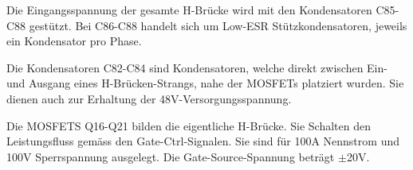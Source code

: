 Die Eingangsspannung der gesamte H-Brücke wird mit den Kondensatoren C85-C88 gestützt.
Bei C86-C88 handelt sich um Low-ESR Stützkondensatoren, jeweils ein Kondensator pro Phase.

Die Kondensatoren C82-C84 sind Kondensatoren, welche direkt zwischen Ein- und Ausgang eines H-Brücken-Strangs, nahe der MOSFETs platziert wurden.
Sie dienen auch zur Erhaltung der 48V-Versorgungsspannung.

Die MOSFETS Q16-Q21 bilden die eigentliche H-Brücke. Sie Schalten den Leistungsfluss gemäss den Gate-Ctrl-Signalen. Sie sind für 100A Nennstrom und 100V Sperrspannung ausgelegt. Die Gate-Source-Spannung beträgt $\pm$20V.